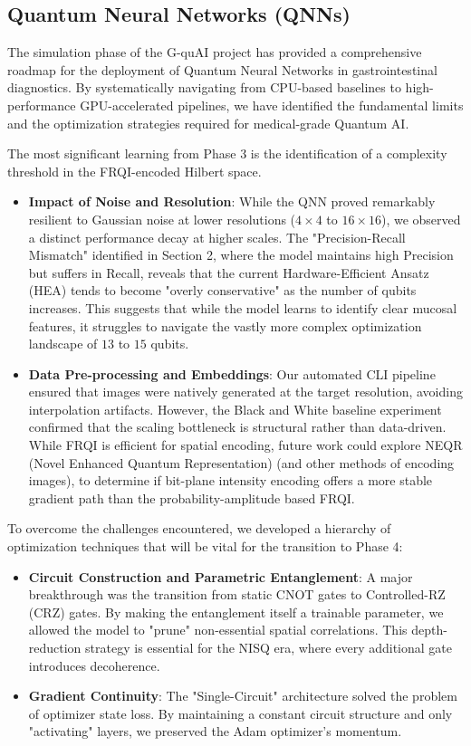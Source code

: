 \documentclass{oqireport}
\begin{document}
\subsection{Quantum Neural Networks (QNNs)}
The simulation phase of the G-quAI project has provided a comprehensive roadmap for the deployment of Quantum Neural Networks in gastrointestinal diagnostics. By systematically navigating from CPU-based baselines to high-performance GPU-accelerated pipelines, we have identified the fundamental limits and the optimization strategies required for medical-grade Quantum AI.

The most significant learning from Phase 3 is the identification of a complexity threshold in the FRQI-encoded Hilbert space. 
\begin{itemize}
    \item \textbf{Impact of Noise and Resolution}: While the QNN proved remarkably resilient to Gaussian noise at lower resolutions ($4\times4$ to $16\times16$), we observed a distinct performance decay at higher scales. The "Precision-Recall Mismatch" identified in Section 2, where the model maintains high Precision but suffers in Recall, reveals that the current Hardware-Efficient Ansatz (HEA) tends to become "overly conservative" as the number of qubits increases. This suggests that while the model learns to identify clear mucosal features, it struggles to navigate the vastly more complex optimization landscape of $13$ to $15$ qubits.
    \item \textbf{Data Pre-processing and Embeddings}: Our automated CLI pipeline ensured that images were natively generated at the target resolution, avoiding interpolation artifacts. However, the Black and White baseline experiment confirmed that the scaling bottleneck is structural rather than data-driven. While FRQI is efficient for spatial encoding, future work could explore NEQR (Novel Enhanced Quantum Representation) (and other methods of encoding images), to determine if bit-plane intensity encoding offers a more stable gradient path than the probability-amplitude based FRQI.
\end{itemize}

To overcome the challenges encountered, we developed a hierarchy of optimization techniques that will be vital for the transition to Phase 4:
\begin{itemize}
    \item \textbf{Circuit Construction and Parametric Entanglement}: A major breakthrough was the transition from static CNOT gates to Controlled-RZ (CRZ) gates. By making the entanglement itself a trainable parameter, we allowed the model to "prune" non-essential spatial correlations. This depth-reduction strategy is essential for the NISQ era, where every additional gate introduces decoherence.
    \item \textbf{Gradient Continuity}: The "Single-Circuit" architecture solved the problem of optimizer state loss. By maintaining a constant circuit structure and only "activating" layers, we preserved the Adam optimizer's momentum. 
\end{itemize}
\end{document}
